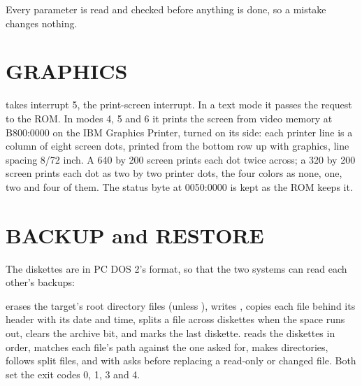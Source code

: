 
Every parameter is read and checked before anything is done, so a mistake
changes nothing.

\section{GRAPHICS}

 takes interrupt 5, the print-screen interrupt. In a text
mode it passes the request to the ROM. In modes 4, 5 and 6 it prints the
screen from video memory at B800:0000 on the IBM Graphics Printer, turned
on its side: each printer line is a column of eight screen dots, printed
from the bottom row up with  graphics, line spacing 8/72
inch. A 640 by 200 screen prints each dot twice across; a 320 by 200
screen prints each dot as two by two printer dots, the four colors as
none, one, two and four of them. The status byte at 0050:0000 is kept as
the ROM keeps it.

\section{BACKUP and RESTORE}

The diskettes are in PC DOS 2's format, so that the two systems can read
each other's backups:



 erases the target's root directory files (unless
), writes , copies each file behind its
header with its date and time, splits a file across diskettes when the
space runs out, clears the archive bit, and marks the last diskette.
 reads the diskettes in order, matches each file's path
against the one asked for, makes directories, follows split files, and
with  asks before replacing a read-only or changed file. Both
set the exit codes 0, 1, 3 and 4.

